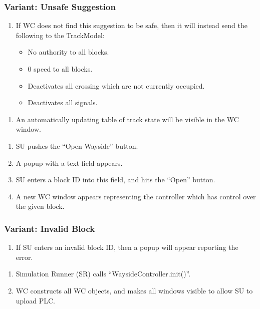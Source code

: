 \documentclass{scrreprt}
\begin{document}
    \subsubsection{Variant: Unsafe Suggestion}
    \begin{enumerate}[label=\arabic*a., start=4]
        \item If WC does not find this suggestion to be safe, then it will instead send the following to the TrackModel:
            \begin{itemize}
                \item No authority to all blocks.
                \item 0 speed to all blocks.
                \item Deactivates all crossing which are not currently occupied.
                \item Deactivates all signals.
            \end{itemize}
    \end{enumerate}

    \begin{enumerate}
        \item An automatically updating table of track state will be visible in the WC window.
    \end{enumerate}

    \begin{enumerate}
        \item SU pushes the ``Open Wayside'' button.
        \item A popup with a text field appears.
        \item SU enters a block ID into this field, and hits the ``Open'' button.
        \item A new WC window appears representing the controller which has control over the given block.
    \end{enumerate}
    \subsubsection{Variant: Invalid Block}
    \begin{enumerate}[label = \arabic*a., start = 4]
        \item If SU enters an invalid block ID, then a popup will appear reporting the error.
    \end{enumerate}

    \begin{enumerate}
        \item Simulation Runner (SR) calls ``WaysideController.init()''.
        \item WC constructs all WC objects, and makes all windows visible to allow SU to upload PLC.
    \end{enumerate}
\end{document}
